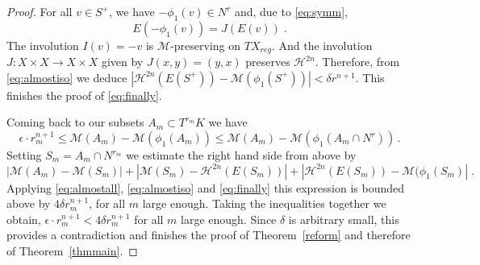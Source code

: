 \documentclass[12pt,leqno,intlimits]{amsart}
\numberwithin{equation}{section}
\newtheorem{lem}[thm]{Lemma}
\theoremstyle{definition}
\theoremstyle{remark}
\newcommand{\tref}[1]{Theorem~\ref{#1}}
\newcommand{\vol}{\mathrm{vol}}
\def\:{\colon}
\begin{document}
\begin{proof}
For all $v\in S^+$, we have $-\phi _1 (v) \in N^r$ and,   due to \eqref{eq:symm},
$$E(-\phi_1 (v)) =J(E(v)) \;.$$
The involution  $I(v)=-v$ is $\mathcal M$-preserving on $TX_{reg}$.  And the involution
 $J\:X\times X\to X\times X$ given by $J(x,y)=(y,x)$ preserves $\mathcal H^{2n}$. Therefore, from \eqref{eq:almostiso} we deduce
 $|\mathcal H^{2n} (E(S^+)) - \mathcal M (\phi _1 (S^+))|  <   \delta r^{n+1} $.
  This finishes the proof of \eqref{eq:finally}.


Coming back to our subsets $A_m\subset T^{r_m} K$ we have
 $$\epsilon \cdot r_m^ {n+1} \leq \mathcal M ( A_m) - \mathcal M( \phi _1 (A_m)) \leq \mathcal M ( A_m) - \mathcal M( \phi _1 (A_m\cap N^r)) \,.$$
Setting  $S_m=A_m\cap N^{r_m}$ we estimate the right hand side from above by
$$|\mathcal M (A_m) -  \mathcal M(S_m)|
+|\mathcal M (S_m )  - \mathcal H^{2n} (E(S_m) )| + | \mathcal H ^{2n} (E(S_m)) - \mathcal M (\phi _1(S_m)|  \;.$$
Applying  \eqref{eq:almostall}, \eqref{eq:almostiso} and \eqref{eq:finally}  this expression is bounded above by $4 \delta r _m^{n+1}$, for all $m$ large enough. Taking the inequalities together we obtain,  $\epsilon \cdot r_m^ {n+1}< 4 \delta r _m^{n+1}$ for all $m$ large enough.
Since $\delta$ is arbitrary small, this provides a  contradiction  and  finishes the proof of \tref{reform} and therefore of \tref{thmmain}.
\end{proof}












\end{document}

